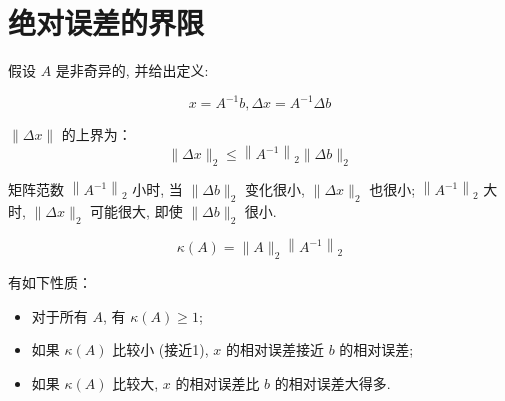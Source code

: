 \section{绝对误差的界限}

假设 $ A $ 是非奇异的, 并给出定义:

\begin{notation}
    $$ x=A^{-1} b, \Delta x=A^{-1} \Delta b $$
\end{notation}

$ \|\Delta x\| $ 的上界为：
$$
\|\Delta x\|_{2} \leq\left\|A^{-1}\right\|_{2}\|\Delta b\|_{2}
$$

矩阵范数 $ \left\|A^{-1}\right\|_{2} $ 小时, 当 $ \|\Delta b\|_{2} $ 变化很小, $ \|\Delta x\|_{2} $ 也很小; $ \left\|A^{-1}\right\|_{2} $ 大时,  $ \|\Delta x\|_{2} $ 可能很大,  即使 $ \|\Delta b\|_{2} $ 很小. 

\begin{definition}
    $$ \kappa(A)=\|A\|_{2}\left\|A^{-1}\right\|_{2} $$
\end{definition}

\begin{corollary}
    有如下性质：

    \begin{itemize}
        \item 对于所有 $ A $, 有 $ \kappa(A) \geq 1 $;
        \item 如果 $ \kappa(A) $ 比较小 (接近1),  $ x $ 的相对误差接近 $ b $ 的相对误差;
        \item 如果 $ \kappa(A) $ 比较大,  $ x $ 的相对误差比 $ b $ 的相对误差大得多. 
    \end{itemize}
\end{corollary}